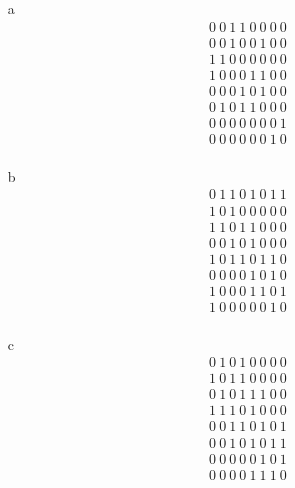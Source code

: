 \documentclass[12pt]{article}
\begin{document}
\begin{enumerate}
\begin{itemize}
		\item [a]
		    \begin{equation*}
		    	\begin{split}
			    0\ 0\ 1\ 1\ 0\ 0\ 0\ 0\\
			    0\ 0\ 1\ 0\ 0\ 1\ 0\ 0\\
			    1\ 1\ 0\ 0\ 0\ 0\ 0\ 0\\
			    1\ 0\ 0\ 0\ 1\ 1\ 0\ 0\\
			    0\ 0\ 0\ 1\ 0\ 1\ 0\ 0\\
			    0\ 1\ 0\ 1\ 1\ 0\ 0\ 0\\
			    0\ 0\ 0\ 0\ 0\ 0\ 0\ 1\\
			    0\ 0\ 0\ 0\ 0\ 0\ 1\ 0\\
		    	\end{split}
		    \end{equation*}
		\item [b]
		    \begin{equation*}
		    	\begin{split}
			    0\ 1\ 1\ 0\ 1\ 0\ 1\ 1\\
			    1\ 0\ 1\ 0\ 0\ 0\ 0\ 0\\
			    1\ 1\ 0\ 1\ 1\ 0\ 0\ 0\\
			    0\ 0\ 1\ 0\ 1\ 0\ 0\ 0\\
			    1\ 0\ 1\ 1\ 0\ 1\ 1\ 0\\
			    0\ 0\ 0\ 0\ 1\ 0\ 1\ 0\\
			    1\ 0\ 0\ 0\ 1\ 1\ 0\ 1\\
			    1\ 0\ 0\ 0\ 0\ 0\ 1\ 0\\
		    	\end{split}
		    \end{equation*}
		\item [c]
		    \begin{equation*}
		    	\begin{split}
			    0\ 1\ 0\ 1\ 0\ 0\ 0\ 0\\
			    1\ 0\ 1\ 1\ 0\ 0\ 0\ 0\\
			    0\ 1\ 0\ 1\ 1\ 1\ 0\ 0\\
			    1\ 1\ 1\ 0\ 1\ 0\ 0\ 0\\
			    0\ 0\ 1\ 1\ 0\ 1\ 0\ 1\\
			    0\ 0\ 1\ 0\ 1\ 0\ 1\ 1\\
			    0\ 0\ 0\ 0\ 0\ 1\ 0\ 1\\
			    0\ 0\ 0\ 0\ 1\ 1\ 1\ 0\\
		    	\end{split}
		    \end{equation*}

\end{itemize}
\end{enumerate}
\end{document}
